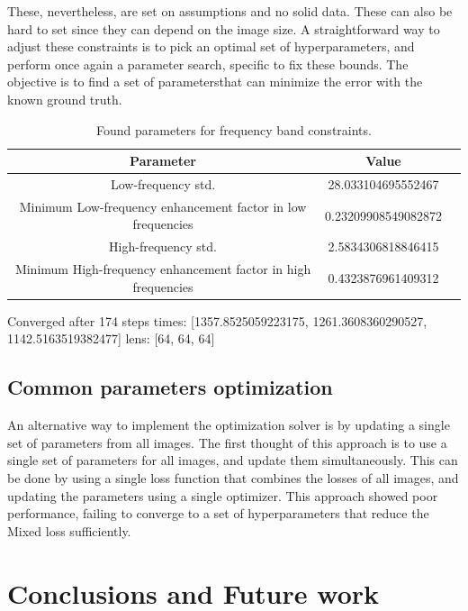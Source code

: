 \documentclass[nomenclature, english, bibtex]{kththesis}
\numberwithin{listing}{chapter}
\begin{document}
These, nevertheless, are set on assumptions and no solid data. These can also be hard to set since they can depend on the image size.
A straightforward way to adjust these constraints is to pick an optimal set of hyperparameters, and perform once again
a parameter search, specific to fix these bounds. The objective is to find a set of parametersthat can
minimize the error with the known ground truth.

\begin{table}
\centering
\begin{tabular}{|c|c|c|}
\hline
Parameter & Value \\
\hline
Low-frequency std. & 28.033104695552467 \\
Minimum Low-frequency enhancement factor in low frequencies & 0.23209908549082872 \\
High-frequency std. & 2.5834306818846415 \\
Minimum High-frequency enhancement factor in high frequencies & 0.4323876961409312 \\
\hline
\end{tabular}
\caption{Found parameters for frequency band constraints.}
\end{table}

Converged after 174 steps
times:  [1357.8525059223175, 1261.3608360290527, 1142.5163519382477]
lens:  [64, 64, 64]

\section{Common parameters optimization}

An alternative way to implement the optimization solver is by updating a single set of parameters from all images.
The first thought of this approach is to use a single set of parameters for all images, and update them simultaneously.
This can be done by using a single loss function that combines the losses of all images, and updating the parameters
using a single optimizer. This approach showed poor performance, failing to converge to a set of hyperparameters
that reduce the Mixed loss sufficiently.




\cleardoublepage
\chapter{Conclusions and Future work}
\label{ch:conclusionsAndFutureWork}
\end{document}
